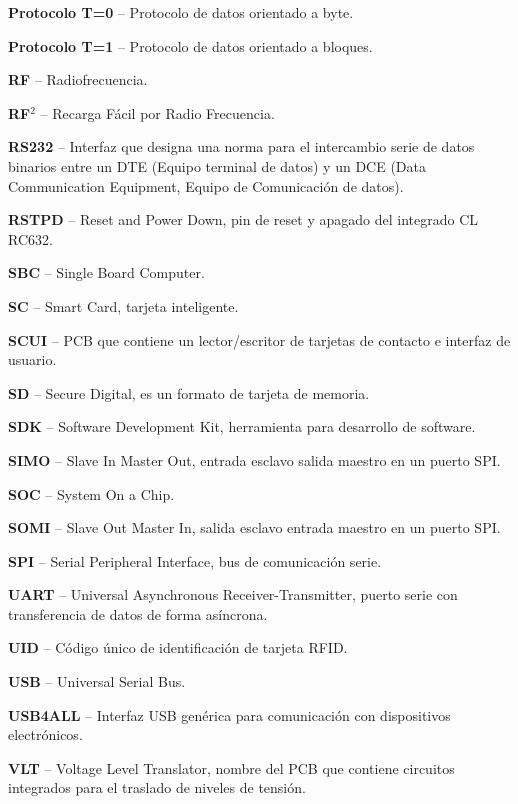 \begin{glosario}
{\bf{Protocolo T=0}} – Protocolo de datos orientado a byte.

{\bf{Protocolo T=1}} – Protocolo de datos orientado a bloques.

{\bf{RF}} – Radiofrecuencia.

{\bf{RF$^{2}$}} – Recarga Fácil por Radio Frecuencia.

{\bf{RS232}} – Interfaz que designa una norma para el intercambio serie de datos binarios entre un DTE (Equipo terminal de datos) y un DCE (Data Communication Equipment, Equipo de Comunicación de datos).

{\bf{RSTPD}} – Reset and Power Down, pin de reset y apagado del integrado CL RC632.

{\bf{SBC}} – Single Board Computer.

{\bf{SC}} – Smart Card, tarjeta inteligente.

{\bf{SCUI}} – PCB que contiene un lector/escritor de tarjetas de contacto e interfaz de usuario.

{\bf{SD}} – Secure Digital, es un formato de tarjeta de memoria.

{\bf{SDK}} – Software Development Kit, herramienta para desarrollo de software.

{\bf{SIMO}} – Slave In Master Out, entrada esclavo salida maestro en un puerto SPI.

{\bf{SOC}} – System On a Chip.

{\bf{SOMI}} – Slave Out Master In, salida esclavo entrada maestro en un puerto SPI.

{\bf{SPI}} – Serial Peripheral Interface, bus de comunicación serie.

{\bf{UART}} – Universal Asynchronous Receiver-Transmitter, puerto serie con transferencia de datos de forma asíncrona.

{\bf{UID}} – Código único de identificación de tarjeta RFID.

{\bf{USB}} – Universal Serial Bus.

{\bf{USB4ALL}} – Interfaz USB genérica para comunicación con dispositivos electrónicos.

{\bf{VLT}} – Voltage Level Translator, nombre del PCB que contiene circuitos integrados para el traslado de niveles de tensión.

\end{glosario}
